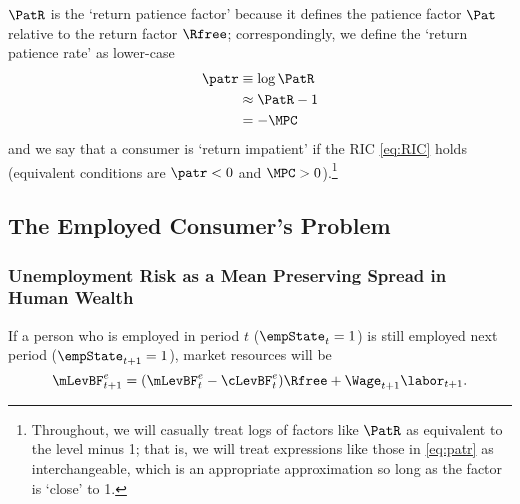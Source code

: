 \documentclass{\handout}
\begin{document}
$\PatR$ is the `return patience factor' because it defines the patience factor $\Pat$
relative to the return factor $\Rfree$; correspondingly, we define the `return
patience rate' as lower-case
\begin{equation}\begin{gathered}\begin{aligned}
   \patr & \equiv   \log \PatR \label{eq:patr}
\\ & \approx \PatR - 1 
\\ & =  -\MPCU
\end{aligned}\end{gathered}\end{equation}
and we say that a consumer is `return impatient' if the RIC \eqref{eq:RIC} holds (equivalent conditions are $\patr < 0$ and $\MPCU > 0$).\footnote{Throughout, we will casually treat logs of factors like $\PatR$ as equivalent to the level minus 1; that is, we will treat expressions like those in \eqref{eq:patr} as interchangeable, which is an appropriate approximation so long as the factor is `close' to 1.}

\subsection{The Employed Consumer's Problem}

\subsubsection{Unemployment Risk as a Mean Preserving Spread in Human Wealth} \label{subsubsec:uMPS}
If a person who is employed in period $t$ ($\empState_{t}=1$) is still employed next
period ($\empState_{t+1}=1$), market resources will be
\begin{equation}
\mLevBF^{e}_{t+1} = (\mLevBF^{e}_{t}-\cLevBF^{e}_{t})\Rfree+\Wage_{t+1}\labor_{t+1}. \label{eq:Metp1}
\end{equation}
\end{document}
